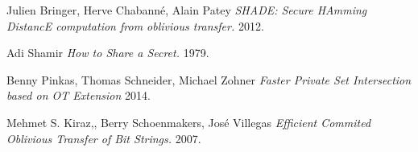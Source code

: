 \documentclass[10pt]{article}
\begin{document}
%
\begin{thebibliography}{1}

 Julien Bringer, Herve Chabanné, Alain Patey {\em SHADE: Secure HAmming DistancE computation from oblivious transfer.} 2012.

 Adi Shamir {\em How to Share a Secret.} 1979.

 Benny Pinkas, Thomas Schneider, Michael Zohner {\em Faster Private Set Intersection based on OT Extension} 2014.

 Mehmet S. Kiraz,, Berry Schoenmakers, José Villegas {\em Efficient Commited Oblivious Transfer of Bit Strings.} 2007.

\end{thebibliography}
\end{document}

